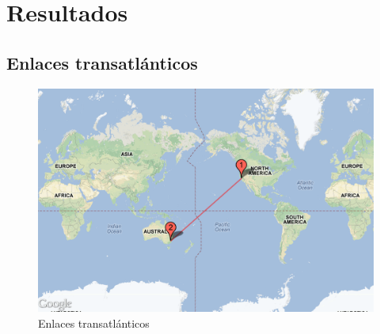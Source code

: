 \section{Resultados}

\subsection{Enlaces transatlánticos}


\begin{figure}[H]
\begin{center}
\includegraphics[width=17cm]{enlaces.png}
\end{center}
\caption{Enlaces transatlánticos} \label{figura1}
\end{figure}



